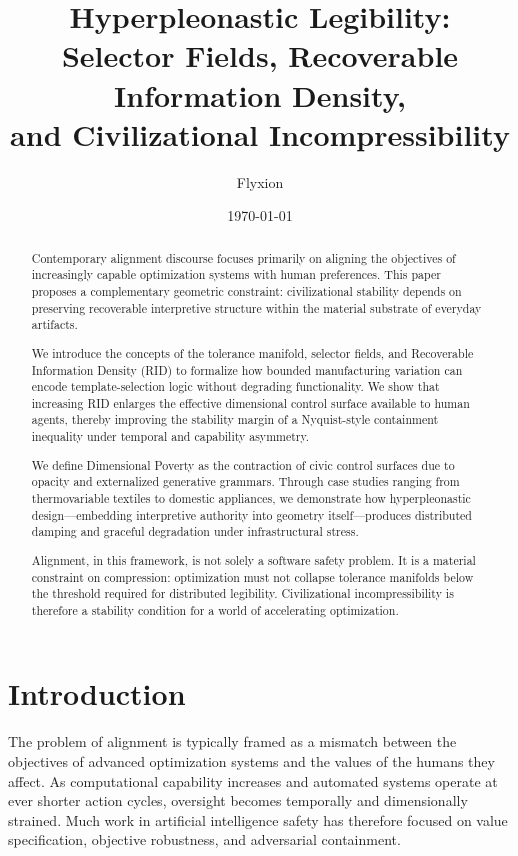 \documentclass[11pt]{article}
\title{Hyperpleonastic Legibility:\\
Selector Fields, Recoverable Information Density,\\
and Civilizational Incompressibility}
\author{Flyxion}
\date{\today}
\begin{document}
\maketitle

\begin{abstract}

Contemporary alignment discourse focuses primarily on aligning the objectives of increasingly capable optimization systems with human preferences. This paper proposes a complementary geometric constraint: civilizational stability depends on preserving recoverable interpretive structure within the material substrate of everyday artifacts. 

We introduce the concepts of the tolerance manifold, selector fields, and Recoverable Information Density (RID) to formalize how bounded manufacturing variation can encode template-selection logic without degrading functionality. We show that increasing RID enlarges the effective dimensional control surface available to human agents, thereby improving the stability margin of a Nyquist-style containment inequality under temporal and capability asymmetry.

We define Dimensional Poverty as the contraction of civic control surfaces due to opacity and externalized generative grammars. Through case studies ranging from thermovariable textiles to domestic appliances, we demonstrate how hyperpleonastic design---embedding interpretive authority into geometry itself---produces distributed damping and graceful degradation under infrastructural stress.

Alignment, in this framework, is not solely a software safety problem. It is a material constraint on compression: optimization must not collapse tolerance manifolds below the threshold required for distributed legibility. Civilizational incompressibility is therefore a stability condition for a world of accelerating optimization.
\end{abstract}

\newpage
\section{Introduction}

The problem of alignment is typically framed as a mismatch between the objectives of advanced optimization systems and the values of the humans they affect. As computational capability increases and automated systems operate at ever shorter action cycles, oversight becomes temporally and dimensionally strained. Much work in artificial intelligence safety has therefore focused on value specification, objective robustness, and adversarial containment.
\end{document}
